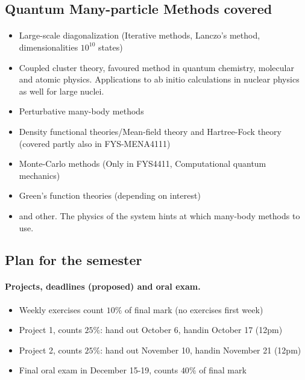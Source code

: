 \documentclass[%
twoside,                 %
final,                   %
10pt]{article}
\begin{document}
\noindent



\subsection{Quantum Many-particle Methods covered}

\paragraph{}
\begin{itemize}
\item Large-scale diagonalization (Iterative methods, Lanczo's method, dimensionalities $10^{10}$ states)

\item Coupled cluster theory, favoured method in quantum chemistry, molecular and atomic physics. Applications to ab initio calculations in nuclear physics as well for large nuclei.

\item Perturbative many-body methods 

\item Density functional theories/Mean-field theory and Hartree-Fock theory (covered partly also in FYS-MENA4111)

\item Monte-Carlo methods (Only in FYS4411, Computational quantum mechanics)

\item Green's function theories (depending on interest)

\item and other. The physics of the system hints at which many-body methods to use.
\end{itemize}

\noindent



\subsection{Plan for the semester}

\paragraph{Projects, deadlines (proposed) and oral exam.}
\begin{itemize}
\item Weekly exercises count $10\%$ of final mark (no exercises  first week)

\item Project 1, counts $25\%$: hand out October 6, handin October 17 (12pm)

\item Project 2, counts $25\%$: hand out November 10, handin November 21 (12pm)

\item Final oral exam in December 15-19, counts $40\%$ of final mark
\end{itemize}
\end{document}
